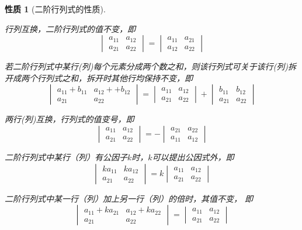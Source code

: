 \documentclass[a4paper]{book}
\newtheorem{prop}{性质}[chapter]
\newcommand{\enum}{\begin{list}{}{\setlength{\leftmargin}{0pt} \setlength{\itemindent}{2.5em} \setlength{\listparindent}{2em}}}
\begin{document}
\begin{prop}[二阶行列式的性质]\

\enum
\item[性质$1$.] 行列互换，二阶行列式的值不变，即
$$\begin{vmatrix} a_{11} & a_{12} \\ a_{21} & a_{22} \end{vmatrix} = \begin{vmatrix} a_{11} & a_{21} \\ a_{12} & a_{22} \end{vmatrix}$$
\item[性质$2$.] 若二阶行列式中某行(列)每个元素分成两个数之和，则该行列式可关于该行(列)拆开成两个行列式之和，拆开时其他行均保持不变，即
$$\begin{vmatrix} a_{11} + b_{11} & a_{12} + + b_{12} \\ a_{21} & a_{22} \end{vmatrix} = \begin{vmatrix} a_{11} & a_{12} \\ a_{21} & a_{22} \end{vmatrix} + \begin{vmatrix} b_{11} & b_{12} \\ a_{21} & a_{22} \end{vmatrix}$$
\item[性质$3$.] 两行(列)互换，行列式的值变号，即
$$\begin{vmatrix} a_{11} & a_{12} \\ a_{21} & a_{22} \end{vmatrix} = -\begin{vmatrix} a_{21} & a_{22} \\ a_{11} & a_{12} \end{vmatrix}$$
\item[性质$4$.] 二阶行列式中某行（列）有公因子$k$时，$k$可以提出公因式外，即
$$\begin{vmatrix} ka_{11} & ka_{12} \\ a_{21} & a_{22} \end{vmatrix} = k\begin{vmatrix} a_{11} & a_{12} \\ a_{21} & a_{22} \end{vmatrix}$$
\item[性质$5$.] 二阶行列式中某一行（列）加上另一行（列）的倍时，其值不变， 即
$$\begin{vmatrix} a_{11} + ka_{21} & a_{12} + ka_{22} \\ a_{21} & a_{22} \end{vmatrix} = \begin{vmatrix} a_{11} & a_{12} \\ a_{21} & a_{22} \end{vmatrix}$$
\end{list}
\end{prop}
\end{document}
